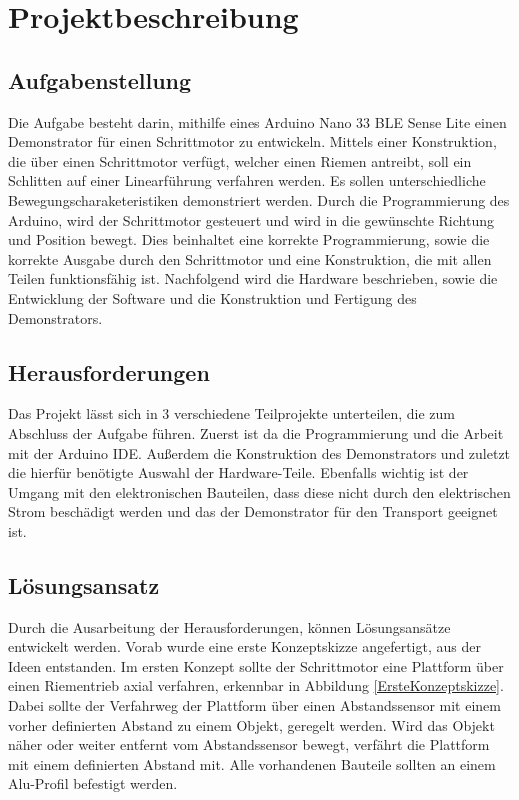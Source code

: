 %
%
%


\chapter{Projektbeschreibung}

\section{Aufgabenstellung}

Die Aufgabe besteht darin, mithilfe eines Arduino Nano 33 BLE Sense Lite einen Demonstrator für einen Schrittmotor zu entwickeln. Mittels einer Konstruktion, die über einen Schrittmotor verfügt, welcher einen Riemen antreibt, soll ein Schlitten auf einer Linearführung verfahren werden. Es sollen unterschiedliche Bewegungscharaketeristiken demonstriert werden. Durch die Programmierung des Arduino, wird der Schrittmotor gesteuert und wird in die gewünschte Richtung und Position bewegt. Dies beinhaltet eine korrekte Programmierung, sowie die korrekte Ausgabe durch den Schrittmotor und eine Konstruktion, die mit allen Teilen funktionsfähig ist. Nachfolgend wird die Hardware beschrieben, sowie die Entwicklung der Software und die Konstruktion und Fertigung des Demonstrators.

\section{Herausforderungen}

Das Projekt lässt sich in 3 verschiedene Teilprojekte unterteilen, die zum Abschluss der Aufgabe führen. Zuerst ist da die Programmierung und die Arbeit mit der Arduino IDE. Außerdem die Konstruktion des Demonstrators und zuletzt die hierfür benötigte Auswahl der Hardware-Teile. Ebenfalls wichtig ist der Umgang mit den elektronischen Bauteilen, dass diese nicht durch den elektrischen Strom beschädigt werden und das der Demonstrator für den Transport geeignet ist. 

\section{Lösungsansatz}
Durch die Ausarbeitung der Herausforderungen, können Lösungsansätze entwickelt werden. Vorab wurde eine erste Konzeptskizze angefertigt, aus der Ideen entstanden. Im ersten Konzept sollte der Schrittmotor eine Plattform über einen Riementrieb axial verfahren, erkennbar in Abbildung \ref{ErsteKonzeptskizze}. Dabei sollte der Verfahrweg der Plattform über einen Abstandssensor mit einem vorher definierten Abstand zu einem Objekt, geregelt werden. Wird das Objekt näher oder weiter entfernt vom Abstandssensor bewegt, verfährt die Plattform mit einem definierten Abstand mit. Alle vorhandenen Bauteile sollten an einem Alu-Profil befestigt werden.

